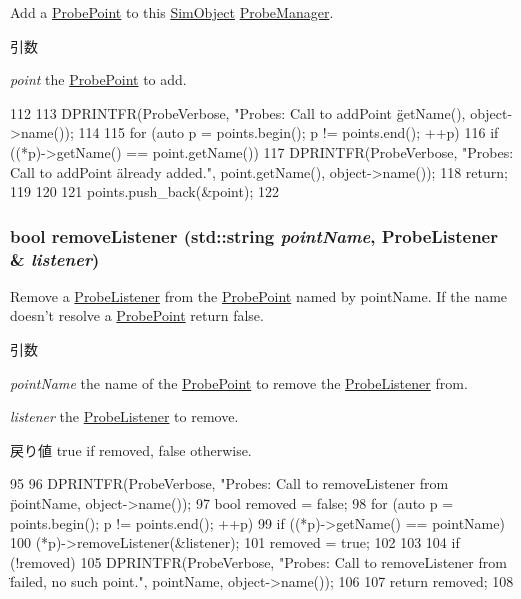 Add a \hyperlink{classProbePoint}{ProbePoint} to this \hyperlink{classSimObject}{SimObject} \hyperlink{classProbeManager}{ProbeManager}. 
\begin{DoxyParams}{引数}
\item[{\em point}]the \hyperlink{classProbePoint}{ProbePoint} to add. \end{DoxyParams}



\begin{DoxyCode}
112 {
113     DPRINTFR(ProbeVerbose, "Probes: Call to addPoint \"%
      getName(), object->name());
114 
115     for (auto p = points.begin(); p != points.end(); ++p) {
116         if ((*p)->getName() == point.getName()) {
117             DPRINTFR(ProbeVerbose, "Probes: Call to addPoint \"%
       already added.\n", point.getName(), object->name());
118             return;
119         }
120     }
121     points.push_back(&point);
122 }
\end{DoxyCode}
\hypertarget{classProbeManager_a97f18fd46da811d5e592045255c16aab}{
\subsubsection[{removeListener}]{\setlength{\rightskip}{0pt plus 5cm}bool removeListener (std::string {\em pointName}, \/  {\bf ProbeListener} \& {\em listener})}}
\label{classProbeManager_a97f18fd46da811d5e592045255c16aab}


Remove a \hyperlink{classProbeListener}{ProbeListener} from the \hyperlink{classProbePoint}{ProbePoint} named by pointName. If the name doesn't resolve a \hyperlink{classProbePoint}{ProbePoint} return false. 
\begin{DoxyParams}{引数}
\item[{\em pointName}]the name of the \hyperlink{classProbePoint}{ProbePoint} to remove the \hyperlink{classProbeListener}{ProbeListener} from. \item[{\em listener}]the \hyperlink{classProbeListener}{ProbeListener} to remove. \end{DoxyParams}
\begin{DoxyReturn}{戻り値}
true if removed, false otherwise. 
\end{DoxyReturn}



\begin{DoxyCode}
95 {
96     DPRINTFR(ProbeVerbose, "Probes: Call to removeListener from \"%
       pointName, object->name());
97     bool removed = false;
98     for (auto p = points.begin(); p != points.end(); ++p) {
99         if ((*p)->getName() == pointName) {
100             (*p)->removeListener(&listener);
101             removed = true;
102         }
103     }
104     if (!removed) {
105         DPRINTFR(ProbeVerbose, "Probes: Call to removeListener from \"%
      failed, no such point.\n", pointName, object->name());
106     }
107     return removed;
108 }
\end{DoxyCode}


